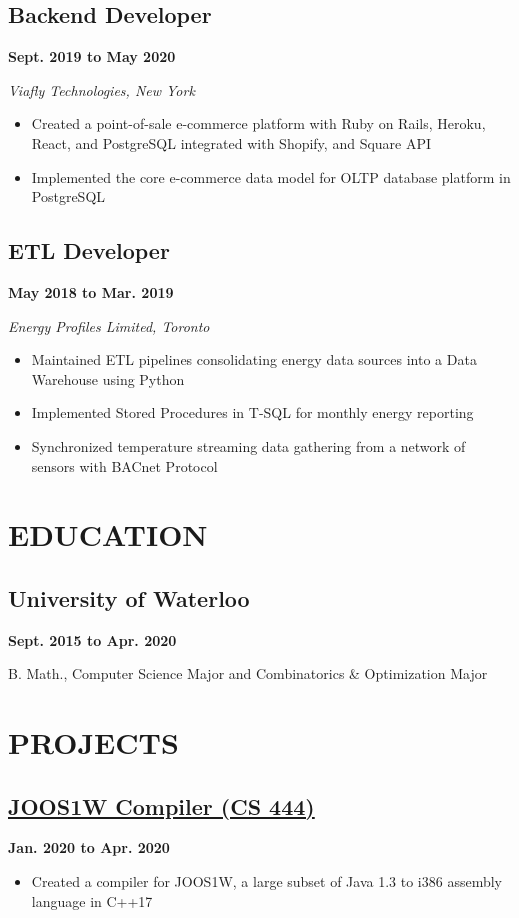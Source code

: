 \documentclass[12pt]{extarticle}
\begin{document}
\subsection*{Backend Developer} \hfill \textbf{Sept. 2019 to May 2020}

\textit{Viafly Technologies, New York}
\begin{itemize}
  \item Created a point-of-sale e-commerce platform with Ruby on Rails, Heroku, React, and PostgreSQL integrated with Shopify, and Square API
  \item Implemented the core e-commerce data model for OLTP database platform in PostgreSQL
\end{itemize}

\subsection*{ETL Developer} \hfill \textbf{May 2018 to Mar. 2019}

\textsl{Energy Profiles Limited, Toronto}
\begin{itemize}
  \item Maintained ETL pipelines consolidating energy data sources into a Data Warehouse using Python
  \item Implemented Stored Procedures in T-SQL for monthly energy reporting
  \item Synchronized temperature streaming data gathering from a network of sensors with BACnet Protocol
\end{itemize}

\section*{EDUCATION}
\subsection*{University of Waterloo} \hfill \textbf{Sept. 2015 to Apr. 2020}

B. Math., Computer Science Major and Combinatorics \& Optimization Major


\section*{PROJECTS}
\subsection*{\href{https://github.com/crash-overdrive/SLC}{JOOS1W Compiler (CS 444)}
} \hfill \textbf{Jan. 2020 to Apr. 2020}
\begin{itemize}
  \item Created a compiler for JOOS1W, a large subset of Java 1.3 to i386 assembly language in C++17
\end{itemize}
\end{document}
